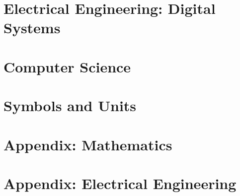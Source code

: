 \documentclass{article}
\newcommand{\LoadCheatsheet}[1]{{}}
\newcommand{\LoadAppendix}[1]{{}}
\begin{document}
\newpage
\section{Electrical Engineering: Digital Systems}
\label{sec:ee-digital}

    \LoadCheatsheet{electrical-engineering-digital-systems/1-basics}
    \newpage
    \LoadCheatsheet{electrical-engineering-digital-systems/2-digital-analogue-interfacing}

\newpage
\section{Computer Science}
\label{sec:compsci}

    \LoadCheatsheet{computer-science}

\newpage
\section{Symbols and Units}
\label{sec:units}

    \LoadCheatsheet{symbols-and-units}

\newpage
{}

\section{Appendix: Mathematics}%
\label{sec:appendix-math}

    \LoadAppendix{mathematics}

\newpage
\section{Appendix: Electrical Engineering}%
\label{sec:appendix-ee}

    \LoadAppendix{electrical-engineering/inductors-and-inductive-coupling}
    \newpage
    \LoadAppendix{electrical-engineering/amplifier-analysis}
\end{document}
